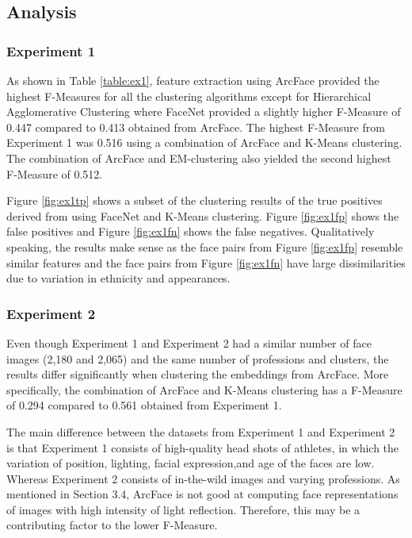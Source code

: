 \documentclass[12pt,english]{article}
\begin{document}
\subsection{Analysis}
\subsubsection{Experiment 1}
\quad
As shown in Table \ref{table:ex1}, feature extraction using ArcFace provided the highest F-Measures for all the clustering algorithms except for Hierarchical Agglomerative Clustering where FaceNet provided a slightly higher F-Measure of 0.447 compared to 0.413 obtained from ArcFace. The highest F-Measure from Experiment 1 was 0.516 using a combination of ArcFace and K-Means clustering. The combination of ArcFace and EM-clustering also yielded the second highest F-Measure of 0.512. 


Figure \ref{fig:ex1tp} shows a subset of the clustering results of the true positives derived from using FaceNet and K-Means clustering.  Figure \ref{fig:ex1fp} shows the false positives and Figure \ref{fig:ex1fn} shows the false negatives. Qualitatively speaking, the results make sense as the face pairs from Figure \ref{fig:ex1fp} resemble similar features and the face pairs from Figure \ref{fig:ex1fn} have large dissimilarities due to variation in ethnicity and appearances.

\subsubsection{Experiment 2}
\quad
Even though Experiment 1 and Experiment 2 had a similar number of face images (2,180 and 2,065) and the same number of professions and clusters, the results differ significantly when clustering the embeddings from ArcFace. More specifically, the combination of ArcFace and K-Means clustering has a F-Measure of 0.294 compared to 0.561 obtained from Experiment 1. 

The main difference between the datasets from Experiment 1 and Experiment 2 is that Experiment 1 consists of high-quality head shots of athletes, in which the variation of position, lighting, facial expression,and age of the faces are low. Whereas Experiment 2 consists of in-the-wild images and varying professions. As mentioned in Section 3.4, ArcFace is not good at computing face representations of images with high intensity of light reflection. Therefore, this may be a contributing factor to the lower F-Measure.
\end{document}
